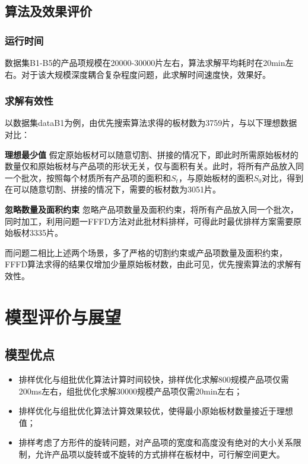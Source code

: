 \documentclass[bwprint]{gmcmthesis}
\begin{document}
\subsection{算法及效果评价}



	
\subsubsection{运行时间}
	 
	数据集B1-B5的产品项规模在20000-30000片左右，算法求解平均耗时在20min左右。对于该大规模深度耦合复杂程度问题，此求解时间速度快，效果好。
		
\subsubsection{求解有效性}

以数据集dataB1为例，由优先搜索算法求得的板材数为3759片，与以下理想数据对比：

\textbf{理想最少值} \quad 假定原始板材可以随意切割、拼接的情况下，即此时所需原始板材的数量仅和原始板材与产品项的形状无关，仅与面积有关。此时，将所有产品放入同一个批次，按照每个材质所有产品项的面积和$S_t$，与原始板材的面积$S_0$对比，得到在可以随意切割、拼接的情况下，需要的板材数为3051片。

\textbf{忽略数量及面积约束} \quad 忽略产品项数量及面积约束，将所有产品放入同一个批次，同时加工，利用问题一FFFD方法对此批材料排样，可得此时最优排样方案需要原始板材3335片。


而问题二相比上述两个场景，多了严格的切割约束或产品项数量及面积约束，FFFD算法求得的结果仅增加少量原始板材数，由此可见，优先搜索算法的求解有效性。



\section{模型评价与展望}
\subsection{模型优点}
\begin{itemize}
    \item 排样优化与组批优化算法计算时间较快，排样优化求解800规模产品项仅需200ms左右，组批优化求解30000规模产品项仅需20min左右；
    \item 排样优化与组批优化算法计算效果较优，使得最小原始板材数量接近于理想值；
    \item 排样考虑了方形件的旋转问题，对产品项的宽度和高度没有绝对的大小关系限制，允许产品项以旋转或不旋转的方式排样在板材中，可行解空间更大。
\end{itemize}
\end{document}
